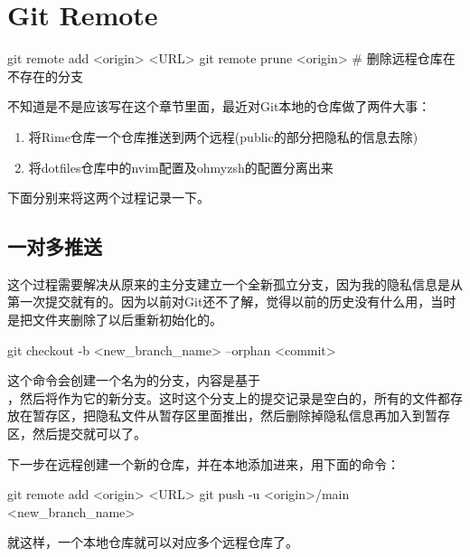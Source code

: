 \section{Git Remote}
\begin{shellcmd}
git remote add <origin> <URL>
git remote prune <origin> # 删除远程仓库在不存在的分支
\end{shellcmd}

不知道是不是应该写在这个章节里面，最近对Git本地的仓库做了两件大事：

\begin{enumerate}
	\item 将Rime仓库一个仓库推送到两个远程(public的部分把隐私的信息去除)
	\item 将dotfiles仓库中的nvim配置及ohmyzsh的配置分离出来
\end{enumerate}

下面分别来将这两个过程记录一下。

\subsection{一对多推送}
这个过程需要解决从原来的主分支建立一个全新孤立分支，因为我的隐私信息是从第一次提交就有的。因为以前对Git还不了解，觉得以前的历史没有什么用，当时是把文件夹删除了以后重新初始化的。
\begin{shellcmd}
	git checkout -b <new_branch_name> --orphan <commit>
\end{shellcmd}
这个命令会创建一个名为的分支，内容是基于\\，然后将作为它的新分支。这时这个分支上的提交记录是空白的，所有的文件都存放在暂存区，把隐私文件从暂存区里面推出，然后删除掉隐私信息再加入到暂存区，然后提交就可以了。

下一步在远程创建一个新的仓库，并在本地添加进来，用下面的命令：
\begin{shellcmd}
git remote add <origin> <URL>
git push -u <origin>/main <new_branch_name>
\end{shellcmd}
就这样，一个本地仓库就可以对应多个远程仓库了。
